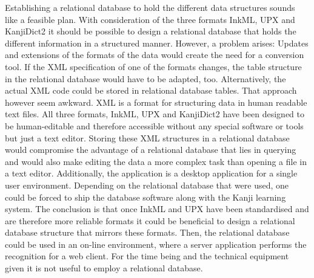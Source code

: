 Establishing a relational database to hold the different data structures 
sounds like a feasible plan. With consideration of the three formats
InkML, UPX and KanjiDict2 it should be possible to design a relational database
that holds the different information in a structured manner.
However, a problem arises: Updates and extensions of the formats
of the data would create the need for a conversion tool.
If the XML specification of one of the formats changes, the table structure
in the relational database would have to be adapted, too.
Alternatively, the actual XML code could be stored in relational database 
tables. That approach however seem awkward. XML is a format for structuring
data in human readable text files. All three formats, InkML, UPX and KanjiDict2
have been designed to be human-editable and therefore accessible without
any special software or tools but just a text editor.
Storing these XML structures in a relational database would compromise the 
advantage of a relational database that lies in querying and would also
make editing the data a more complex task than opening a file in a text editor.
Additionally, the application is a desktop application for a single user 
environment. Depending on the relational database that were used,
one could be forced to ship the database software along with the Kanji 
learning system.
The conclusion is that once InkML and UPX have been standardised and are
therefore more reliable formats it could be beneficial to design a relational
database structure that mirrors these formats.
Then, the relational database could be used in an on-line environment, 
where a server application performs the recognition for a web client.
For the time being and the technical equipment given it is not 
useful to employ a relational database.




